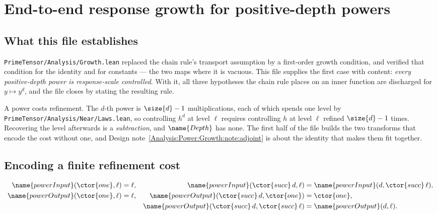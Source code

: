 
\section{End-to-end response growth for positive-depth powers}
\label{Analysis:Power:Growth:sec}


\subsection*{What this file establishes}

\texttt{PrimeTensor/Analysis/Growth.lean} replaced the chain rule's transport
assumption by a first-order growth condition, and verified that condition for
the identity and for constants --- the two maps where it is vacuous.  This file
supplies the first case with content: \emph{every positive-depth power is
response-scale controlled}.  With it, all three hypotheses the chain rule
places on an inner function are discharged for $y \mapsto y^{d}$, and the file
closes by stating the resulting rule.

A power costs refinement.  The $d$-th power is $\size{d} - 1$ multiplications,
each of which spends one level by
\texttt{PrimeTensor/Analysis/Near/Laws.lean}, so controlling $h^{d}$ at level
$\ell$ requires controlling $h$ at level $\ell$ refined $\size{d}-1$ times.
Recovering the level afterwards is a \emph{subtraction}, and $\name{Depth}$ has
none.  The first half of the file builds the two transforms that encode the
cost without one, and
Design note~\ref{Analysis:Power:Growth:note:adjoint} is about the identity that
makes them fit together.

\subsection{Encoding a finite refinement cost}

\begin{definition}
\label{Analysis:Power:Growth:def:transforms}
\begin{align*}
  \name{powerInput}(\ctor{one}, \ell) &= \ell, &
  \name{powerInput}(\ctor{succ}\,d, \ell)
    &= \name{powerInput}(d, \ctor{succ}\,\ell), \\
  \name{powerOutput}(\ctor{one}, \ell) &= \ell, &
  \name{powerOutput}(\ctor{succ}\,d, \ctor{one}) &= \ctor{one}, \\
  &&\name{powerOutput}(\ctor{succ}\,d, \ctor{succ}\,\ell)
    &= \name{powerOutput}(d, \ell).
\end{align*}
\end{definition}

